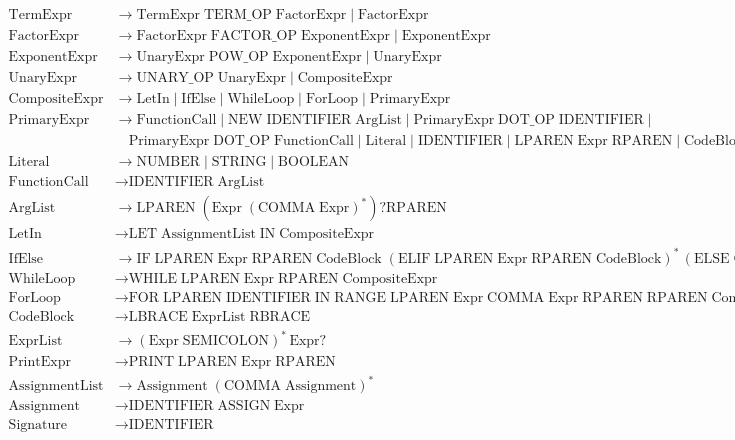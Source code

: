\documentclass[a4paper,12pt]{article}
\begin{document}
\begin{align*}
\text{TermExpr} &\rightarrow \text{TermExpr}\; \text{TERM\_OP}\; \text{FactorExpr} \mid \text{FactorExpr} \\
\text{FactorExpr} &\rightarrow \text{FactorExpr}\; \text{FACTOR\_OP}\; \text{ExponentExpr} \mid \text{ExponentExpr} \\
\text{ExponentExpr} &\rightarrow \text{UnaryExpr}\; \text{POW\_OP}\; \text{ExponentExpr} \mid \text{UnaryExpr} \\
\text{UnaryExpr} &\rightarrow \text{UNARY\_OP}\; \text{UnaryExpr} \mid \text{CompositeExpr} \\
\text{CompositeExpr} &\rightarrow \text{LetIn} \mid \text{IfElse} \mid \text{WhileLoop} \mid \text{ForLoop} \mid \text{PrimaryExpr} \\
\text{PrimaryExpr} &\rightarrow \text{FunctionCall} \mid \text{NEW}\; \text{IDENTIFIER}\; \text{ArgList} \mid \text{PrimaryExpr}\; \text{DOT\_OP}\; \text{IDENTIFIER} \mid \\
&\quad \text{PrimaryExpr}\; \text{DOT\_OP}\; \text{FunctionCall} \mid \text{Literal} \mid \text{IDENTIFIER} \mid \text{LPAREN}\; \text{Expr}\; \text{RPAREN} \mid \text{CodeBlock} \mid \text{PrintExpr} \\
\text{Literal} &\rightarrow \text{NUMBER} \mid \text{STRING} \mid \text{BOOLEAN} \\
\text{FunctionCall} &\rightarrow \text{IDENTIFIER}\; \text{ArgList} \\
\text{ArgList} &\rightarrow \text{LPAREN}\; (\text{Expr}\; (\text{COMMA}\; \text{Expr})^*)? \text{RPAREN} \\
\text{LetIn} &\rightarrow \text{LET}\; \text{AssignmentList}\; \text{IN}\; \text{CompositeExpr} \\
\text{IfElse} &\rightarrow \text{IF}\; \text{LPAREN}\; \text{Expr}\; \text{RPAREN}\; \text{CodeBlock}\; (\text{ELIF}\; \text{LPAREN}\; \text{Expr}\; \text{RPAREN}\; \text{CodeBlock})^*\, (\text{ELSE}\; \text{CodeBlock})? \\
\text{WhileLoop} &\rightarrow \text{WHILE}\; \text{LPAREN}\; \text{Expr}\; \text{RPAREN}\; \text{CompositeExpr} \\
\text{ForLoop} &\rightarrow \text{FOR}\; \text{LPAREN}\; \text{IDENTIFIER}\; \text{IN}\; \text{RANGE}\; \text{LPAREN}\; \text{Expr}\; \text{COMMA}\; \text{Expr}\; \text{RPAREN}\; \text{RPAREN}\; \text{CompositeExpr} \\
\text{CodeBlock} &\rightarrow \text{LBRACE}\; \text{ExprList}\; \text{RBRACE} \\
\text{ExprList} &\rightarrow (\text{Expr}\; \text{SEMICOLON})^*\, \text{Expr}? \\
\text{PrintExpr} &\rightarrow \text{PRINT}\; \text{LPAREN}\; \text{Expr}\; \text{RPAREN} \\
\text{AssignmentList} &\rightarrow \text{Assignment}\; (\text{COMMA}\; \text{Assignment})^* \\
\text{Assignment} &\rightarrow \text{IDENTIFIER}\; \text{ASSIGN}\; \text{Expr} \\
\text{Signature} &\rightarrow \text{IDENTIFIER}
\end{align*}
\end{document}
